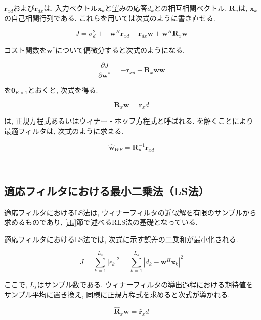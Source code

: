 \(\bm{r}_{xd}\)および\(\bm{r}_{dx}\)は, 入力ベクトル\(\bm{x}_k\)と望みの応答\(d_k\)との相互相関ベクトル, \(\bm{R}_u\)は, \(\bm{x}_k\)の自己相関行列である. これらを用いては次式のように書き直せる. 

\begin{equation}
J =\sigma_d^2 + - \bm{w}^H \bm{r}_{xd} -\bm{r}_{dx} \bm{w} + \bm{w}^H \bm{R}_x \bm{w}
\label{equ:J_sigma}
\end{equation}

コスト関数を\(\bm{w}^*\)について偏微分すると次式のようになる. 

\begin{equation}
\frac{\partial J}{\partial \bm{w}^*} = - \bm{r}_{xd} + \bm{R}_x \bm{w}
\bm{w}
\label{equ:J_partial}
\end{equation}

を\(\bm{0}_{K \times 1}\)とおくと, 次式を得る. 

\begin{equation}
\bm{R}_x \bm{w} = \bm{r}_xd
\label{equ:Rwr}
\end{equation}

は, 正規方程式あるいはウィナー・ホッフ方程式と呼ばれる. を解くことにより最適フィルタは, 次式のように求まる\cite{signal_processing_for_array}. 

\begin{equation}
\hat{\bm{w}}_{WF} = \bm{R}_u^{-1} \bm{r}_{xd}
\end{equation}

\
\subsection{適応フィルタにおける最小二乗法（LS法）}\label{ls}

適応フィルタにおけるLS法は, ウィナーフィルタの近似解を有限のサンプルから求めるものであり, \ref{rls}節で述べるRLS法の基礎となっている. 

適応フィルタにおけるLS法では, 次式に示す誤差の二乗和が最小化される. 

\begin{equation}
J = \sum_{k=1}^{L_s} |\epsilon_k|^2 = \sum_{k=1}^{L_s} |d_k - \bm{w}^H \bm{x}_k|^2
\end{equation}

ここで, \(L_s\)はサンプル数である. ウィナーフィルタの導出過程における期待値をサンプル平均に置き換え, 同様に正規方程式を求めると次式が導かれる. 

\begin{equation}
\hat{\bm{R}}_x \bm{w} = \hat{\bm{r}}_xd
\end{equation}

